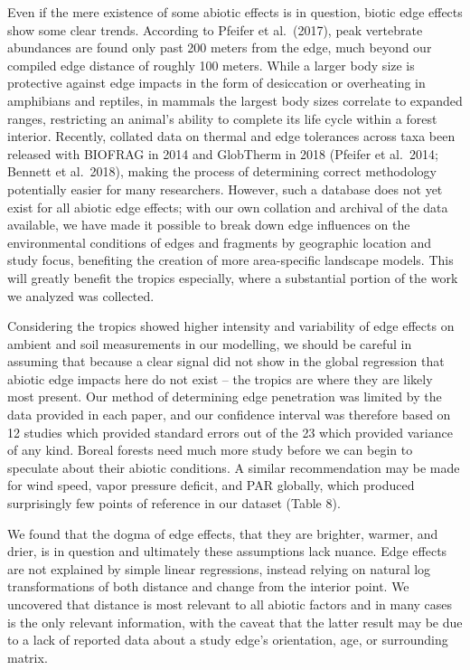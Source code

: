 \documentclass[
  man]{apa6}
\begin{document}
Even if the mere existence of some abiotic effects is in question, biotic edge effects show some clear trends. According to Pfeifer et al.~(2017), peak vertebrate abundances are found only past 200 meters from the edge, much beyond our compiled edge distance of roughly 100 meters. While a larger body size is protective against edge impacts in the form of desiccation or overheating in amphibians and reptiles, in mammals the largest body sizes correlate to expanded ranges, restricting an animal's ability to complete its life cycle within a forest interior. Recently, collated data on thermal and edge tolerances across taxa been released with BIOFRAG in 2014 and GlobTherm in 2018 (Pfeifer et al.~2014; Bennett et al.~2018), making the process of determining correct methodology potentially easier for many researchers. However, such a database does not yet exist for all abiotic edge effects; with our own collation and archival of the data available, we have made it possible to break down edge influences on the environmental conditions of edges and fragments by geographic location and study focus, benefiting the creation of more area-specific landscape models. This will greatly benefit the tropics especially, where a substantial portion of the work we analyzed was collected.

Considering the tropics showed higher intensity and variability of edge effects on ambient and soil measurements in our modelling, we should be careful in assuming that because a clear signal did not show in the global regression that abiotic edge impacts here do not exist -- the tropics are where they are likely most present. Our method of determining edge penetration was limited by the data provided in each paper, and our confidence interval was therefore based on 12 studies which provided standard errors out of the 23 which provided variance of any kind. Boreal forests need much more study before we can begin to speculate about their abiotic conditions. A similar recommendation may be made for wind speed, vapor pressure deficit, and PAR globally, which produced surprisingly few points of reference in our dataset (Table 8).

We found that the dogma of edge effects, that they are brighter, warmer, and drier, is in question and ultimately these assumptions lack nuance. Edge effects are not explained by simple linear regressions, instead relying on natural log transformations of both distance and change from the interior point. We uncovered that distance is most relevant to all abiotic factors and in many cases is the only relevant information, with the caveat that the latter result may be due to a lack of reported data about a study edge's orientation, age, or surrounding matrix.
\end{document}
